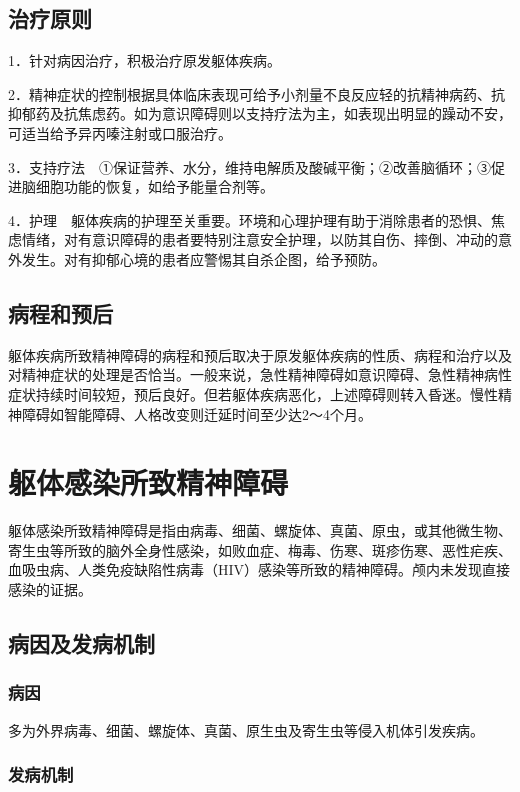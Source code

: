 \subsection{治疗原则}

1．针对病因治疗，积极治疗原发躯体疾病。

2．精神症状的控制根据具体临床表现可给予小剂量不良反应轻的抗精神病药、抗抑郁药及抗焦虑药。如为意识障碍则以支持疗法为主，如表现出明显的躁动不安，可适当给予异丙嗪注射或口服治疗。

3．支持疗法　①保证营养、水分，维持电解质及酸碱平衡；②改善脑循环；③促进脑细胞功能的恢复，如给予能量合剂等。

4．护理　躯体疾病的护理至关重要。环境和心理护理有助于消除患者的恐惧、焦虑情绪，对有意识障碍的患者要特别注意安全护理，以防其自伤、摔倒、冲动的意外发生。对有抑郁心境的患者应警惕其自杀企图，给予预防。

\subsection{病程和预后}

躯体疾病所致精神障碍的病程和预后取决于原发躯体疾病的性质、病程和治疗以及对精神症状的处理是否恰当。一般来说，急性精神障碍如意识障碍、急性精神病性症状持续时间较短，预后良好。但若躯体疾病恶化，上述障碍则转入昏迷。慢性精神障碍如智能障碍、人格改变则迁延时间至少达2～4个月。

\section{躯体感染所致精神障碍}

躯体感染所致精神障碍是指由病毒、细菌、螺旋体、真菌、原虫，或其他微生物、寄生虫等所致的脑外全身性感染，如败血症、梅毒、伤寒、斑疹伤寒、恶性疟疾、血吸虫病、人类免疫缺陷性病毒（HIV）感染等所致的精神障碍。颅内未发现直接感染的证据。

\subsection{病因及发病机制}

\subsubsection{病因}

多为外界病毒、细菌、螺旋体、真菌、原生虫及寄生虫等侵入机体引发疾病。

\subsubsection{发病机制}

